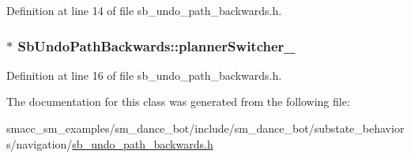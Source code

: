 Definition at line 14 of file sb\+\_\+undo\+\_\+path\+\_\+backwards.\+h.

\subsubsection[{\texorpdfstring{planner\+Switcher\+\_\+}{plannerSwitcher_}}]{$\ast$ Sb\+Undo\+Path\+Backwards\+::planner\+Switcher\+\_\+\hspace{0.3cm}{\ttfamily [private]}}\hypertarget{classSbUndoPathBackwards_a881b1b8e6bcab14d59e26c09aaa3c7c0}{}\label{classSbUndoPathBackwards_a881b1b8e6bcab14d59e26c09aaa3c7c0}


Definition at line 16 of file sb\+\_\+undo\+\_\+path\+\_\+backwards.\+h.



The documentation for this class was generated from the following file\+:\begin{DoxyCompactItemize}
\item 
smacc\+\_\+sm\+\_\+examples/sm\+\_\+dance\+\_\+bot/include/sm\+\_\+dance\+\_\+bot/substate\+\_\+behaviors/navigation/\hyperlink{sb__undo__path__backwards_8h}{sb\+\_\+undo\+\_\+path\+\_\+backwards.\+h}\end{DoxyCompactItemize}
